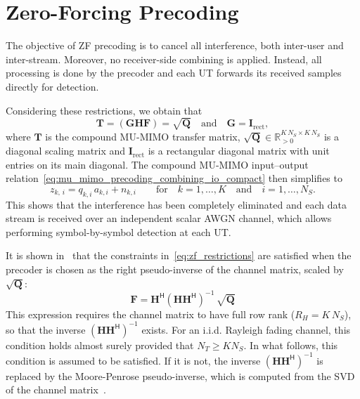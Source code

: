 \section{Zero-Forcing Precoding}
\label{subsection:mu_mimo_zf_precoding}

The objective of \acf{ZF} precoding is to cancel all interference, both inter-user and inter-stream.
Moreover, no receiver-side combining is applied. Instead, all processing is done by the precoder and each \ac{UT} forwards its received samples directly for detection.

Considering these restrictions, we obtain that
\begin{equation}
\label{eq:zf_restrictions}
    \mathbf{T} = (\mathbf{G}\mathbf{H}\mathbf{F}) = \sqrt{\mathbf{Q}} \quad \text{and} \quad \mathbf{G} = \mathbf{I}_{\mathrm{rect}},
\end{equation}
where $\mathbf{T}$ is the compound \ac{MU}-\ac{MIMO} transfer matrix, $\sqrt{\mathbf{Q}} \in \mathbb{R}_{>0}^{K\,N_S \times K\,N_S}$ is a diagonal scaling matrix and $\mathbf{I}_{\mathrm{rect}}$ is a rectangular diagonal matrix with unit entries on its main diagonal.
The compound \ac{MU}-\ac{MIMO} input--output relation~\eqref{eq:mu_mimo_precoding_combining_io_compact} then simplifies to
\begin{equation}
\label{eq:zf_io}
    z_{k,\,i} = q_{k, i} \, a_{k, i} + n_{k, i} \qquad \text{for} \quad k = 1, \dots, K \quad \text{and} \quad i = 1, \dots, N_S.
\end{equation}
This shows that the interference has been completely eliminated and each data stream is received over an independent scalar \ac{AWGN} channel, which allows performing symbol-by-symbol detection at each \ac{UT}.

It is shown in~\cite{mu_mimo_ZF_precoding} that the constraints in~\eqref{eq:zf_restrictions} are satisfied when the precoder is chosen as the right pseudo-inverse of the channel matrix, scaled by $\sqrt{\mathbf{Q}}$:
\begin{equation}
\label{eq:zf_precoder}
    \mathbf{F} = \mathbf{H}^{\mathsf{H}} (\mathbf{H} \mathbf{H}^{\mathsf{H}})^{-1} \, \sqrt{\mathbf{Q}}
\end{equation}
This expression requires the channel matrix to have full row rank ($R_H = K\,N_S$), so that the inverse $(\mathbf{H}\mathbf{H}^{\mathsf{H}})^{-1}$ exists.
For an \ac{i.i.d.} Rayleigh fading channel, this condition holds almost surely provided that $N_T \geq K N_S$.
In what follows, this condition is assumed to be satisfied.
If it is not, the inverse $(\mathbf{H}\mathbf{H}^{\mathsf{H}})^{-1}$ is replaced by the Moore-Penrose pseudo-inverse, which is computed from the \ac{SVD} of the channel matrix~\cite{moore_penrose_pseudoinverse}.

